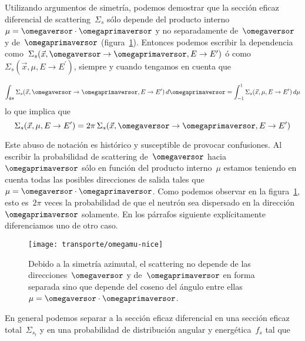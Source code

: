 Utilizando argumentos de simetría, podemos demostrar que la sección eficaz diferencial de scattering~$\Sigma_s$ sólo depende del producto interno~$\mu = \omegaversor \cdot \omegaprimaversor$ y no separadamente de~$\omegaversor$ y de~$\omegaprimaversor$ (figura~\ref{fig:omegamu}). Entonces podemos escribir la dependencia como~$\Sigma_s(\vec{x}, \omegaversor \rightarrow \omegaprimaversor, E \rightarrow E^\prime)$ ó como~$\Sigma_s(\vec{x}, \mu, E \rightarrow E^\prime)$, siempre y cuando tengamos en cuenta que

\begin{equation*}
\int_{4\pi} \Sigma_s(\vec{x}, \omegaversor \rightarrow \omegaprimaversor, E \rightarrow E^\prime) \, d\omegaprimaversor = 
\int_{-1}^{1} \Sigma_s(\vec{x}, \mu, E \rightarrow E^\prime) \, d\mu
\end{equation*}
%
lo que implica que
\begin{equation*}
 \Sigma_s(\vec{x}, \mu, E \rightarrow E^\prime) = 2\pi \, \Sigma_s(\vec{x}, \omegaversor \rightarrow \omegaprimaversor, E \rightarrow E^\prime)
\end{equation*}

Este abuso de notación es histórico y susceptible de provocar confusiones. Al escribir la probabilidad de scattering de~$\omegaversor$ hacia~$\omegaprimaversor$ sólo en función del producto interno~$\mu$ estamos teniendo en cuenta todas las posibles direcciones de salida tales que~$\mu  = \omegaversor \cdot \omegaprimaversor$.
Como podemos observar en la figura~\ref{fig:omegamu}, esto es~$2\pi$ veces la probabilidad de que el neutrón sea dispersado en la dirección~$\omegaprimaversor$ solamente. En los párrafos siguiente explícitamente diferenciamos uno de otro caso.

\begin{figure}[bh]
 \begin{center}
  \texttt{[image: transporte/omegamu-nice]}
 \end{center}
\caption{\label{fig:omegamu}Debido a la simetría azimutal, el scattering no depende de las direcciones~$\omegaversor$ y de~$\omegaprimaversor$ en forma separada sino que depende del coseno del ángulo entre ellas~$\mu = \omegaversor \cdot \omegaprimaversor$.}
\end{figure}


\bigskip

En general podemos separar a la sección eficaz diferencial en una sección eficaz total~$\Sigma_{s_t}$ y en una probabilidad de distribución angular y energética~$f_s$ tal que

